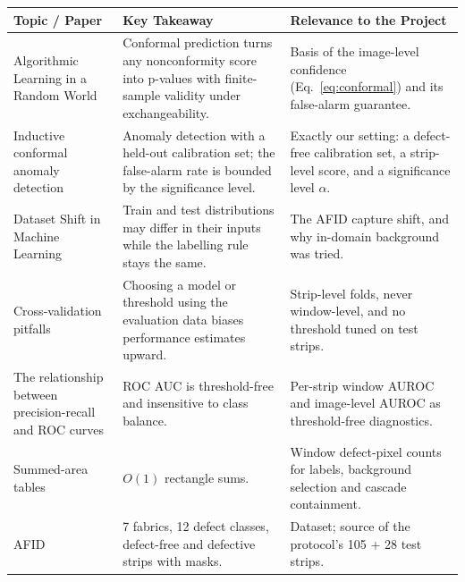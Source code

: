 \documentclass[11pt,a4paper]{article}
\begin{document}
\begin{center}
\small
\renewcommand{\arraystretch}{1.15}
\begin{longtable}{@{}p{}p{}p{}@{}}
\toprule
\rowcolor{hdr}\textbf{Topic / Paper} & \textbf{Key Takeaway} & \textbf{Relevance to the Project} \\
\midrule
\endhead
Algorithmic Learning in a Random World \cite{vovk2005} & Conformal prediction turns any nonconformity score into p-values with finite-sample validity under exchangeability. & Basis of the image-level confidence (Eq.~\ref{eq:conformal}) and its false-alarm guarantee. \\
Inductive conformal anomaly detection \cite{laxhammar2015} & Anomaly detection with a held-out calibration set; the false-alarm rate is bounded by the significance level. & Exactly our setting: a defect-free calibration set, a strip-level score, and a significance level $\alpha$. \\
Dataset Shift in Machine Learning \cite{quinonero2009} & Train and test distributions may differ in their inputs while the labelling rule stays the same. & The AFID capture shift, and why in-domain background was tried. \\
Cross-validation pitfalls \cite{varma2006} & Choosing a model or threshold using the evaluation data biases performance estimates upward. & Strip-level folds, never window-level, and no threshold tuned on test strips. \\
The relationship between precision-recall and ROC curves \cite{davis2006} & ROC AUC is threshold-free and insensitive to class balance. & Per-strip window AUROC and image-level AUROC as threshold-free diagnostics. \\
Summed-area tables \cite{crow1984} & $O(1)$ rectangle sums. & Window defect-pixel counts for labels, background selection and cascade containment. \\
AFID \cite{silvestre2019} & 7 fabrics, 12 defect classes, defect-free and defective strips with masks. & Dataset; source of the protocol's 105 + 28 test strips. \\
\bottomrule
\end{longtable}
\end{center}
\end{document}
